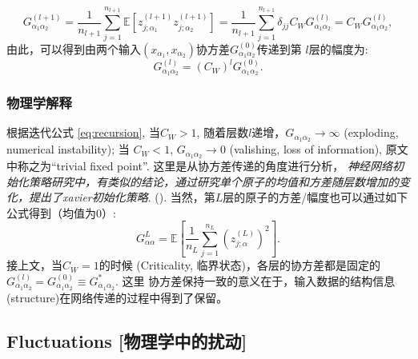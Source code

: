 \begin{equation}
    G_{\alpha_1\alpha_2}^{(l+1)} = 
        \frac{1}{n_{l+1}} \sum_{j=1}^{n_{l+1}} \mathbb{E}[z_{j;\alpha_1}^{(l+1)}z_{j;\alpha_2}^{(l+1)}] 
        = \frac{1}{n_{l+1}}\sum_{j=1}^{n_{l+1}} \delta_{jj}C_W G_{\alpha_1\alpha_2}^{(l)}
        = C_W G_{\alpha_1\alpha_2}^{(l)},
\end{equation}
由此，可以得到由两个输入$(x_{\alpha_1}, x_{\alpha_2})$协方差$G_{\alpha_1\alpha_2}^{(0)}$传递到第
$l$层的幅度为:
\begin{equation}
    G_{\alpha_1\alpha_2}^{(l)} = (C_W)^l G_{\alpha_1\alpha_2}^{(0)}.
    \label{eq:recursion}
\end{equation} 

\subsubsection{物理学解释}
\label{sec:2point-ana}
根据迭代公式 \ref{eq:recursion}, 当$C_W > 1$, 随着层数$l$递增，$G_{\alpha_1\alpha_2} \to \infty$ (exploding,
numerical instability); 当 $C_W < 1$, $G_{\alpha_1\alpha_2} \to 0$ (valishing, loss of information), 
原文中称之为``trivial fixed point''. 这里是从协方差传递的角度进行分析， 
\emph{神经网络初始化策略研究中，有类似的结论，通过研究单个原子的均值和方差随层数增加的变化，提出了xavier初始化策略}.
(). 当然，第$L$层的原子的方差/幅度也可以通过如下公式得到（均值为$0$）:
\begin{equation*}
    G_{\alpha\alpha}^L = \mathbb{E} [\frac{1}{n_L} \sum_{j=1}^{n_L}(z_{j;\alpha}^{(L)})^2].
\end{equation*}
接上文，当$C_W=1$的时候 (Criticality, 临界状态)，各层的协方差都是固定的 
$G_{\alpha_1\alpha_2}^{(l)} = G_{\alpha_1\alpha_2}^{(0)} \equiv G_{\alpha_1\alpha_2}^*$. 这里
协方差保持一致的意义在于，输入数据的结构信息(structure)在网络传递的过程中得到了保留。

\subsection{Fluctuations [物理学中的扰动]}
